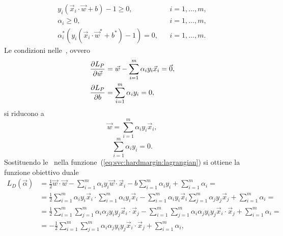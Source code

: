 \begin{align}
    \label{eq:svc:hardmargin:kkt3}
    y_i(\Vec{x}_i\cdot\Vec{w}+b)-1 \geq 0, && i=1,\dots,m,  \\[2mm]
    \label{eq:svc:hardmargin:kkt4}
    \alpha_i \geq 0, && i=1,\dots,m,  \\[2mm]
    \label{eq:svc:hardmargin:kkt5}
    \alpha_i^*(y_i(\Vec{x}_i\cdot\Vec{w}^*+b^*)-1) = 0,  && i=1,\dots,m.
\end{align}
%
Le condizioni nelle~, ovvero
\begin{align*}
    \frac{\partial{L_P}}{\partial{\Vec{w}}} &= \Vec{w} - \sum_{i=1}^{m}\alpha_iy_i\Vec{x}_i = \Vec{0},\\
    \frac{\partial{L_P}}{\partial{b}} &=  \sum_{i=1}^{m}\alpha_iy_i =0,
\end{align*}
si riducono a
\begin{equation}
\label{eq:svc_sub1}
\Vec{w} = \sum_{i=1}^{m}\alpha_iy_i\Vec{x}_i,
\end{equation}
\begin{equation}
\label{eq:svc_sub2}
\sum_{i=1}^{m}\alpha_iy_i = 0.
\end{equation}
Sostituendo le~ nella funzione~(\ref{eq:svc:hardmargin:lagrangian}) si ottiene la funzione obiettivo duale
\begin{equation}
\label{eq:svc:hardmargin:dual_obj_fn}
\begin{split}
L_D(\vec{\alpha})  & = \frac{1}{2}\Vec{w}\cdot\Vec{w} - \sum_{i=1}^{m} \alpha_i y_i \Vec{w}\cdot \Vec{x}_i - b \sum_{i=1}^{m} \alpha_i y_i + \sum_{i=1}^{m} \alpha_i =\\
 &= \frac{1}{2}\sum_{i=1}^{m}\alpha_iy_i\Vec{x}_i \cdot \sum_{i=1}^{m}\alpha_iy_i\Vec{x}_i - \sum_{i=1}^{m} \alpha_i y_i \Vec{x}_i \sum_{j=1}^{m}\alpha_jy_j\Vec{x}_j + \sum_{i=1}^{m} \alpha_i =\\
 &= \frac{1}{2}\sum_{i=1}^{m}\sum_{j=1}^{m}\alpha_i\alpha_jy_iy_j\Vec{x}_i\cdot\Vec{x}_j - 
 \sum_{i=1}^{m}\sum_{j=1}^{m}\alpha_i\alpha_jy_iy_j\Vec{x}_i\cdot\Vec{x}_j + \sum_{i=1}^{m} \alpha_i =\\
 &= -\frac{1}{2}\sum_{i=1}^{m}\sum_{j=1}^{m}\alpha_i\alpha_jy_iy_j\Vec{x}_i\cdot\Vec{x}_j + \sum_{i=1}^{m} \alpha_i,
\end{split}  
\end{equation}
